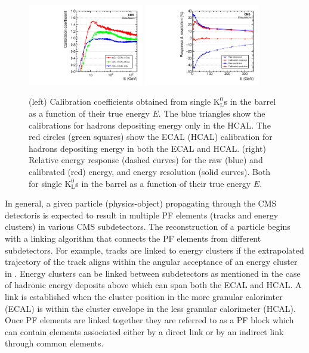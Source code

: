 \begin{figure}[htbp]
\centering
     \includegraphics[width=0.45\textwidth]{object_reconstruction_and_selection/plots/calo_calibrations.pdf}
     \includegraphics[width=0.45\textwidth]{object_reconstruction_and_selection/plots/calo_response_and_res.pdf}
     \caption{
(left) Calibration coefficients obtained from single $\text{K}^{0}_{\text{L}}$s in the barrel as a 
function of their true energy $E$. The blue triangles show the calibrations for hadrons depositing 
energy only in the HCAL. The red circles (green squares) show the ECAL (HCAL) calibration for hadrons
depositing energy in both the ECAL and HCAL.
(right) Relative energy response (dashed curves) for the raw (blue) and calibrated (red) energy, and 
energy resolution (solid curves). Both for single $\text{K}^{0}_{\text{L}}$s in the barrel as a 
function of their true energy $E$.
     }
     \label{fig:pf_calo_calib}
\end{figure}


In general, a given particle (physics-object) propagating through the CMS detectoris 
is expected to result in multiple PF elements (tracks and energy
clusters) in various CMS subdetectors. The reconstruction of a particle begins 
with a linking algorithm that connects the PF elements from different subdetectors. For example,
tracks are linked to energy clusters if the extrapolated trajectory of the track aligns within the
angular acceptance of an energy cluster in \etaphi. Energy clusters can be linked between subdetectors as mentioned
in the case of hadronic energy deposits above which can span both the ECAL and HCAL. A link is established
when the cluster position in the more granular calorimter (ECAL) is within the cluster envelope
in the less granular calorimeter (HCAL). Once PF elements are linked together they are referred to as a PF block which can contain 
elements associated either by a direct link or by an indirect link through common elements.


